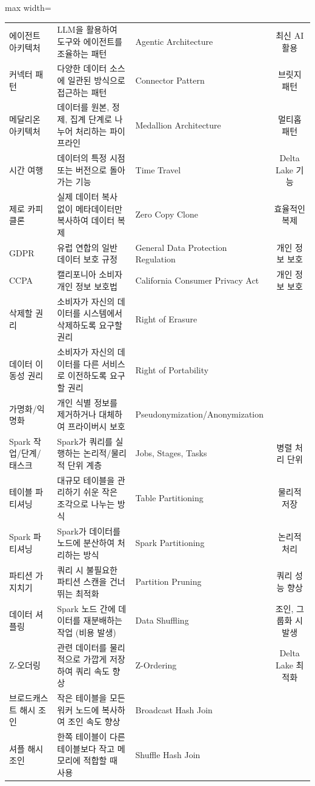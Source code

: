 \documentclass[11pt,a4paper]{article}
\theoremstyle{definition}
\begin{document}
\begin{adjustbox}{max width=\textwidth}
\begin{tabular}{lllc}
에이전트 아키텍처 & LLM을 활용하여 도구와 에이전트를 조율하는 패턴 & Agentic Architecture & 최신 AI 활용 \\
커넥터 패턴 & 다양한 데이터 소스에 일관된 방식으로 접근하는 패턴 & Connector Pattern & 브릿지 패턴 \\
메달리온 아키텍처 & 데이터를 원본, 정제, 집계 단계로 나누어 처리하는 파이프라인 & Medallion Architecture & 멀티홉 패턴 \\
시간 여행 & 데이터의 특정 시점 또는 버전으로 돌아가는 기능 & Time Travel & Delta Lake 기능 \\
제로 카피 클론 & 실제 데이터 복사 없이 메타데이터만 복사하여 데이터 복제 & Zero Copy Clone & 효율적인 복제 \\
GDPR & 유럽 연합의 일반 데이터 보호 규정 & General Data Protection Regulation & 개인 정보 보호 \\
CCPA & 캘리포니아 소비자 개인 정보 보호법 & California Consumer Privacy Act & 개인 정보 보호 \\
삭제할 권리 & 소비자가 자신의 데이터를 시스템에서 삭제하도록 요구할 권리 & Right of Erasure & \\
데이터 이동성 권리 & 소비자가 자신의 데이터를 다른 서비스로 이전하도록 요구할 권리 & Right of Portability & \\
가명화/익명화 & 개인 식별 정보를 제거하거나 대체하여 프라이버시 보호 & Pseudonymization/Anonymization & \\
Spark 작업/단계/태스크 & Spark가 쿼리를 실행하는 논리적/물리적 단위 계층 & Jobs, Stages, Tasks & 병렬 처리 단위 \\
테이블 파티셔닝 & 대규모 테이블을 관리하기 쉬운 작은 조각으로 나누는 방식 & Table Partitioning & 물리적 저장 \\
Spark 파티셔닝 & Spark가 데이터를 노드에 분산하여 처리하는 방식 & Spark Partitioning & 논리적 처리 \\
파티션 가지치기 & 쿼리 시 불필요한 파티션 스캔을 건너뛰는 최적화 & Partition Pruning & 쿼리 성능 향상 \\
데이터 셔플링 & Spark 노드 간에 데이터를 재분배하는 작업 (비용 발생) & Data Shuffling & 조인, 그룹화 시 발생 \\
Z-오더링 & 관련 데이터를 물리적으로 가깝게 저장하여 쿼리 속도 향상 & Z-Ordering & Delta Lake 최적화 \\
브로드캐스트 해시 조인 & 작은 테이블을 모든 워커 노드에 복사하여 조인 속도 향상 & Broadcast Hash Join & \\
셔플 해시 조인 & 한쪽 테이블이 다른 테이블보다 작고 메모리에 적합할 때 사용 & Shuffle Hash Join & \\

\end{tabular}
\end{adjustbox}
\end{document}
